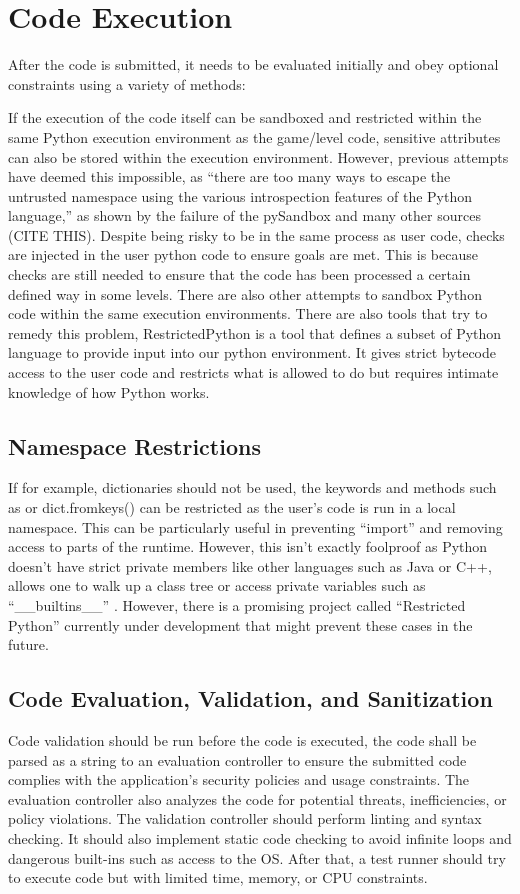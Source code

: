 \section{Code Execution}
After the code is submitted, it needs to be evaluated initially and obey optional constraints using a variety of methods:

If the execution of the code itself can be sandboxed and restricted within the same Python execution environment as the game/level code, sensitive attributes can also be stored within the execution environment. However, previous attempts have deemed this impossible, as “there are too many ways to escape the untrusted namespace using the various introspection features of the Python language,” as shown by the failure of the pySandbox and many other sources (CITE THIS). Despite being risky to be in the same process as user code, checks are injected in the user python code to ensure goals are met. This is because checks are still needed to ensure that the code has been processed a certain defined way in some levels. There are also other attempts to sandbox Python code within the same execution environments. There are also tools that try to remedy this problem, RestrictedPython is a tool that defines a subset of Python language to provide input into our python environment. It gives strict bytecode access to the user code and restricts what is allowed to do but requires intimate knowledge of how Python works. 
\subsection{Namespace Restrictions}
If for example, dictionaries should not be used, the keywords and methods such as {} or dict.fromkeys() can be restricted as the user’s code is run in a local namespace. This can be particularly useful in preventing “import” and removing access to parts of the runtime. 
However, this isn’t exactly foolproof as Python doesn't have strict private members like other languages such as Java or C++, allows one to walk up a class tree or access private variables such as “\_\_builtins\_\_” \cite{stackexchange_untrusted_python}. However, there is a promising project called “Restricted Python” \cite{restricted_python} currently under development that might prevent these cases in the future. 
\subsection{Code Evaluation, Validation, and Sanitization}
Code validation should be run before the code is executed, the code shall be parsed as a string to an evaluation controller to ensure the submitted code complies with the application's security policies and usage constraints. The evaluation controller also analyzes the code for potential threats, inefficiencies, or policy violations.
The validation controller should perform linting and syntax checking. It should also implement static code checking to avoid infinite loops and dangerous built-ins such as access to the OS. After that, a test runner should try to execute code but with limited time, memory, or CPU constraints.
